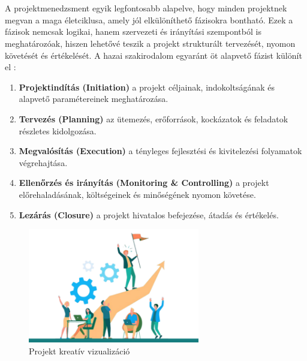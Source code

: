 \chapter{\projectlifecycle}

A projektmenedzsment egyik legfontosabb alapelve, hogy minden projektnek megvan a maga életciklusa, 
amely jól elkülöníthető fázisokra bontható. 
Ezek a fázisok nemcsak logikai, hanem szervezeti és irányítási szempontból is meghatározóak, 
hiszen lehetővé teszik a projekt strukturált tervezését, nyomon követését és értékelését. 
A hazai szakirodalom egyaránt öt alapvető fázist különít el \cite{Szalay2018,Hajdu2014}:

\begin{enumerate}
    \item \textbf{Projektindítás (Initiation)} a projekt céljainak, indokoltságának és alapvető paramétereinek meghatározása.
    \item \textbf{Tervezés (Planning)} az ütemezés, erőforrások, kockázatok és feladatok részletes kidolgozása.
    \item \textbf{Megvalósítás (Execution)} a tényleges fejlesztési és kivitelezési folyamatok végrehajtása.
    \item \textbf{Ellenőrzés és irányítás (Monitoring \& Controlling)} a projekt előrehaladásának, költségeinek és minőségének nyomon követése.
    \item \textbf{Lezárás (Closure)} a projekt hivatalos befejezése, átadás és értékelés.
\end{enumerate}

\begin{figure}[H]
    \centering
    \includegraphics[width=75mm, keepaspectratio]{figures/project_creative.png}
    \caption{Projekt kreatív vizualizáció}
    \label{fig:project_creative}
\end{figure}

